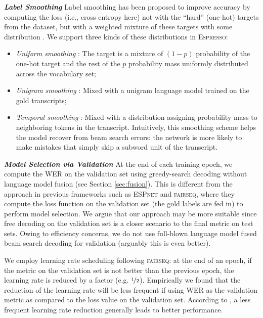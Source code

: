 \documentclass{article}
\def\espresso{\textsc{Espresso}\xspace}
\def\fairseq{\textsc{fairseq}\xspace}
\def\espnet{\textsc{ESPnet}\xspace}
\begin{document}
\vspace{0.2cm}
\noindent \textbf{\textit{Label Smoothing}}\quad
Label smoothing \cite{szegedy2016rethinking} has been proposed to improve accuracy by computing the loss (i.e., cross entropy here) not with the ``hard'' (one-hot) targets from the dataset, but with a weighted mixture of these targets with some distribution \cite{mueller2019labelsmoothing}. We support three kinds of these distributions in \espresso:
\begin{itemize} \setlength\itemsep{0cm}
    \item \emph{Uniform smoothing} \cite{szegedy2016rethinking}: The target is a mixture of $(1-p)$ probability of the one-hot target and the rest of the $p$ probability mass uniformly distributed across the vocabulary set;
    \item \emph{Unigram smoothing} \cite{pereyra2017regularizing}: Mixed with a unigram language model trained on the gold transcripts;
    \item \emph{Temporal smoothing} \cite{chorowski2017towards}: Mixed with a distribution assigning probability mass to neighboring tokens in the transcript. Intuitively, this smoothing scheme helps the model recover from beam search errors: the network is more likely to make mistakes that simply skip a subword unit of the transcript.
\end{itemize}



\vspace{0.2cm}
\noindent \textbf{\textit{Model Selection via Validation}}\quad
At the end of each training epoch, we compute the WER on the validation set using greedy-search decoding without language model fusion (see Section \ref{sec:fusion}). This is different from the approach in previous frameworks such as \espnet and \fairseq, where they compute the loss function on the validation set (the gold labels are fed in) to perform model selection. We argue that our approach may be more suitable since free decoding on the validation set is a closer scenario to the final metric on test sets. Owing to efficiency concerns, we do not use full-blown language model fused beam search decoding for validation (arguably this is even better).

We employ learning rate scheduling following \fairseq: at the end of an epoch, if the metric on the validation set is not better than the previous epoch, the learning rate is reduced by a factor (e.g. $\nicefrac{1}{2}$). Empirically we found that the reduction of the learning rate will be less frequent if using WER as the validation metric as compared to the loss value on the validation set. According to \cite{specaugment}, a less frequent learning rate reduction generally leads to better performance.
\end{document}
